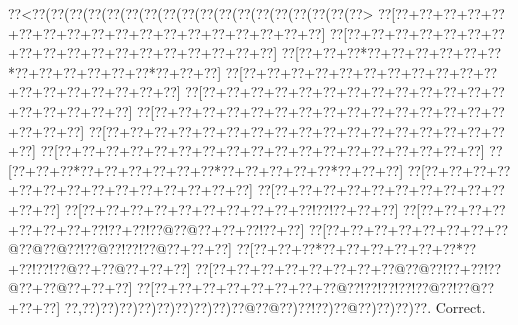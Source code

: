 \documentclass[a5paper]{article}
\begin{document}
\begin{center}
{\goo
\0??<\0??(\0??(\0??(\0??(\0??(\0??(\0??(\0??(\0??(\0??(\0??(\0??(\0??(\0??(\0??(\0??(\0??(\0??>
\0??[\0??+\0??+\0??+\0??+\0??+\0??+\0??+\0??+\0??+\0??+\0??+\0??+\0??+\0??+\0??+\0??+\0??+\0??]
\0??[\0??+\0??+\0??+\0??+\0??+\0??+\0??+\0??+\0??+\0??+\0??+\0??+\0??+\0??+\0??+\0??+\0??+\0??]
\0??[\0??+\0??+\0??*\0??+\0??+\0??+\0??+\0??+\0??*\0??+\0??+\0??+\0??+\0??+\0??*\0??+\0??+\0??]
\0??[\0??+\0??+\0??+\0??+\0??+\0??+\0??+\0??+\0??+\0??+\0??+\0??+\0??+\0??+\0??+\0??+\0??+\0??]
\0??[\0??+\0??+\0??+\0??+\0??+\0??+\0??+\0??+\0??+\0??+\0??+\0??+\0??+\0??+\0??+\0??+\0??+\0??]
\0??[\0??+\0??+\0??+\0??+\0??+\0??+\0??+\0??+\0??+\0??+\0??+\0??+\0??+\0??+\0??+\0??+\0??+\0??]
\0??[\0??+\0??+\0??+\0??+\0??+\0??+\0??+\0??+\0??+\0??+\0??+\0??+\0??+\0??+\0??+\0??+\0??+\0??]
\0??[\0??+\0??+\0??+\0??+\0??+\0??+\0??+\0??+\0??+\0??+\0??+\0??+\0??+\0??+\0??+\0??+\0??+\0??]
\0??[\0??+\0??+\0??*\0??+\0??+\0??+\0??+\0??+\0??*\0??+\0??+\0??+\0??+\0??*\0??+\0??+\0??]
\0??[\0??+\0??+\0??+\0??+\0??+\0??+\0??+\0??+\0??+\0??+\0??+\0??+\0??+\0??]
\0??[\0??+\0??+\0??+\0??+\0??+\0??+\0??+\0??+\0??+\0??+\0??+\0??]
\0??[\0??+\0??+\0??+\0??+\0??+\0??+\0??+\0??+\0??+\0??!\0??!\0??+\0??+\0??]
\0??[\0??+\0??+\0??+\0??+\0??+\0??+\0??+\0??!\0??+\0??!\0??@\0??@\0??+\0??+\0??!\0??+\0??]
\0??[\0??+\0??+\0??+\0??+\0??+\0??+\0??+\0??@\0??@\0??@\0??!\0??@\0??!\0??!\0??@\0??+\0??+\0??]
\0??[\0??+\0??+\0??*\0??+\0??+\0??+\0??+\0??+\0??*\0??+\0??!\0??!\0??@\0??+\0??@\0??+\0??+\0??]
\0??[\0??+\0??+\0??+\0??+\0??+\0??+\0??+\0??@\0??@\0??!\0??+\0??!\0??@\0??+\0??@\0??+\0??+\0??]
\0??[\0??+\0??+\0??+\0??+\0??+\0??+\0??+\0??@\0??!\0??!\0??!\0??!\0??@\0??!\0??@\0??+\0??+\0??]
\0??,\0??)\0??)\0??)\0??)\0??)\0??)\0??)\0??)\0??@\0??@\0??)\0??!\0??)\0??@\0??)\0??)\0??)\0??.
}
Correct. 

\end{center}
\end{document}
